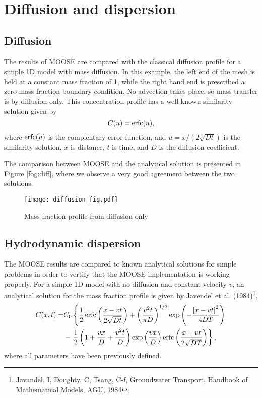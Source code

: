\chapter{Diffusion and dispersion}
\section{Diffusion}

The results of MOOSE are compared with the classical diffusion profile
for a simple 1D model with mass diffusion. In this example, the left end of
the mesh is held at a constant mass fraction of 1, while the right hand end is
prescribed a zero mass fraction boundary condition. No advection takes place, so
mass transfer is by diffusion only. This concentration profile has a well-known
similarity solution given by
\begin{equation}
C(u) = \operatorname{erfc}(u),
\end{equation}
where $\operatorname{erfc}(u)$ is the complentary error function, and $u = x/(2 \sqrt{D t})$ is the
similarity solution, $x$ is distance, $t$ is time, and $D$ is the diffusion coefficient.

The comparison between MOOSE and the analytical solution is presented in Figure \ref{fog:diff}, where we observe a very good agreement between the two solutions.
\begin{figure}[htb]
\centering
\texttt{[image: diffusion\_fig.pdf]}
\caption{Mass fraction profile from diffusion only}
\label{fig:diff}
\end{figure}

\section{Hydrodynamic dispersion}

The MOOSE results are compared to known analytical solutions for simple problems in order to vertify that the MOOSE implementation is working properly. For a simple 1D model with no diffusion and constant velocity $v$, an analytical solution for the mass fraction profile is given by Javendel et al. (1984)\footnote{Javandel, I, Doughty, C, Tsang, C-f, Groundwater Transport, Handbook of Mathematical Models, AGU, 1984},
\begin{align}
C(x, t) = & C_0 \left\{ \frac{1}{2} \operatorname{erfc}\left(\frac{x- v t}{2 \sqrt{D t}}\right) + \left(\frac{v^2 t}{\pi D}\right)^{1/2}
\exp \left(- \frac{\left[x - vt\right]^2}{4 D T}\right)\right. \nonumber \\
& - \left. \frac{1}{2} \left(1 + \frac{v x}{D} + \frac{v^2 t}{D} \right) \exp\left(\frac{v x}{D}\right) \operatorname{erfc}\left(\frac{x+v t}{2 \sqrt{D T}}\right)\right\},
\end{align}
where all parameters have been previously defined.


